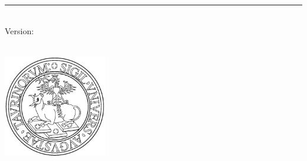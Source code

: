 %
\begin{titlepage}
	\flushright
	\hfill
	\vfill
	{\LARGE\thesisTitle \par}
	\rule[5pt]{\textwidth}{.4pt} \par
	{\Large\thesisName}
	\vfill
	\textit{\large\thesisDate} \\
	Version: \thesisVersion
\end{titlepage}


\begin{titlepage}
	\tgherosfont
	\centering

	{\Large \thesisUniversity} \\[4mm]
	\includegraphics[width=4.5cm]{gfx/logo} \\[2mm]
	\textsf{\large \thesisUniversityInstitute} \\
	\textsf{\large \thesisUniversityDepartment} \\

	\vfill
	{\large \thesisSubject} \\[5mm]
	{\LARGE \color{ctcolortitle}\textbf{\thesisTitle} \\[10mm]}
	{\Large \thesisName} \\


\end{titlepage}
